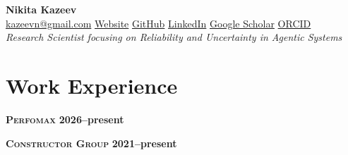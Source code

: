 \documentclass[11pt,a4paper]{article}
\begin{document}
\begin{center}
  {\LARGE\bfseries Nikita Kazeev}\\[3pt]
  {\small
    \href{mailto:kazeevn@gmail.com}{kazeevn@gmail.com} \textperiodcentered{}
    \href{https://kazeevn.github.io}{Website} \textperiodcentered{}
    \href{https://github.com/kazeevn}{GitHub} \textperiodcentered{}
    \href{https://linkedin.com/in/nikita-kazeev}{LinkedIn} \textperiodcentered{}
    \href{https://scholar.google.com/citations?user=vamy2okAAAAJ}{Google Scholar} \textperiodcentered{}
    \href{https://orcid.org/0000-0002-5699-7634}{ORCID}%
  }\\[5pt]
  \textit{ Research Scientist focusing on Reliability and Uncertainty in Agentic Systems }
\end{center}

\section{Work Experience}
\textsc{\textbf{\boldmath{}Perfomax}} \hfill\textbf{2026--present}\par
\smallskip

\textsc{\textbf{\boldmath{}Constructor Group}} \hfill\textbf{2021--present}\par
\smallskip
\end{document}
